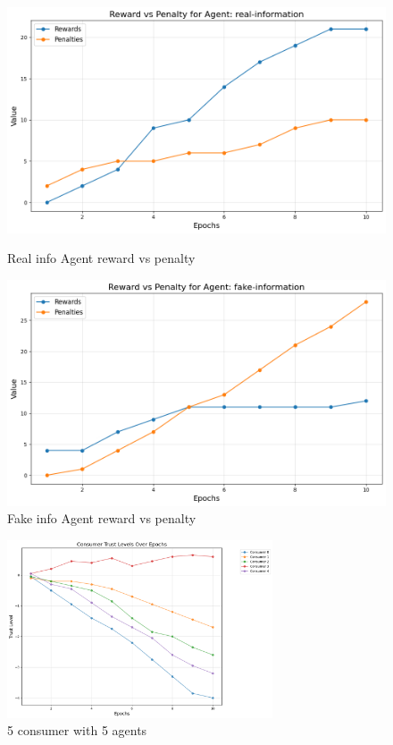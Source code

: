 \documentclass[twoside]{article}
\begin{document}
\begin{figure}[htbp]
     \centering
     \begin{minipage}[b]{0.45\textwidth}
         \centering
         \includegraphics[width=\textwidth]{../results/multi_real_agent/real_rp.png}
         \caption{Real info Agent reward vs penalty}
         \label{fig:image4}
     \end{minipage}
     \hfill
     \begin{minipage}[b]{0.45\textwidth}
         \centering
         \includegraphics[width=\textwidth]{../results/multi_real_agent/fake_rp.png}
         \caption{Fake info Agent reward vs penalty}
         \label{fig:image5}
     \end{minipage}
 \end{figure}

\begin{figure}[htbp]
     \centering
     \includegraphics[width=0.7\textwidth]{../results/multi_real_agent/consumertrust.png}
     \caption{5 consumer with 5 agents}
     \label{fig: 5 consumer, 5 agentss}
 \end{figure}
\end{document}
